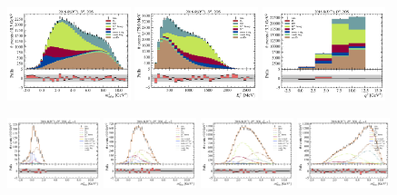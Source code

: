 \begin{figure}[htb]
    \centering
    \includegraphics[width=0.32\textwidth]{./figs-fit-fit-results/ctrl-fit/stacked/fit_result-stacked-D0-2os-mmiss2.pdf}
    \includegraphics[width=0.32\textwidth]{./figs-fit-fit-results/ctrl-fit/stacked/fit_result-stacked-D0-2os-el.pdf}
    \includegraphics[width=0.32\textwidth]{./figs-fit-fit-results/ctrl-fit/stacked/fit_result-stacked-D0-2os-q2.pdf}

    \includegraphics[width=0.24\textwidth]{./figs-fit-fit-results/ctrl-fit/lines_q2_slices/fit_result-lines_q2_idx1-D0-2os-mmiss2.pdf}
    \includegraphics[width=0.24\textwidth]{./figs-fit-fit-results/ctrl-fit/lines_q2_slices/fit_result-lines_q2_idx2-D0-2os-mmiss2.pdf}
    \includegraphics[width=0.24\textwidth]{./figs-fit-fit-results/ctrl-fit/lines_q2_slices/fit_result-lines_q2_idx3-D0-2os-mmiss2.pdf}
    \includegraphics[width=0.24\textwidth]{./figs-fit-fit-results/ctrl-fit/lines_q2_slices/fit_result-lines_q2_idx4-D0-2os-mmiss2.pdf}


\end{figure}
